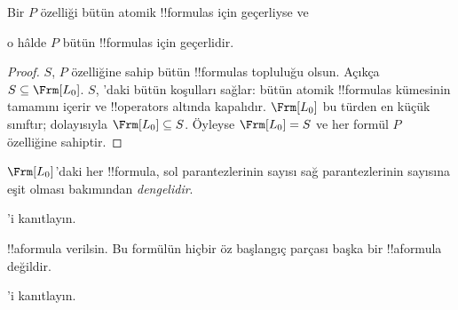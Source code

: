 \documentclass[../../../include/open-logic-section]{subfiles}
\begin{document}


\begin{thm}
  Bir $P$ özelliği bütün atomik !!{formula}s için geçerliyse ve
  \begin{enumerate}
  \end{enumerate}
  o hâlde $P$ bütün !!{formula}s için geçerlidir.
\end{thm}

\begin{proof}
  $S$, $P$ özelliğine sahip bütün !!{formula}s topluluğu olsun. Açıkça
  $S \subseteq \Frm[L_0]$. $S$, 'daki bütün
  koşulları sağlar: bütün atomik !!{formula}s kümesinin tamamını içerir ve
  !!{operator}s
  altında kapalıdır. $\Frm[L_0]$ bu türden en küçük sınıftır; dolayısıyla
  $\Frm[L_0] \subseteq S$. Öyleyse $\Frm[L_0] = S$ ve her formül $P$
  özelliğine sahiptir.
\end{proof}

\begin{prop}
   $\Frm[L_0]$'daki her !!{formula}, sol parantezlerinin sayısı sağ
   parantezlerinin sayısına eşit olması bakımından \emph{dengelidir}.
\end{prop}

\begin{prob}
'i kanıtlayın.
\end{prob}

\begin{prop} 
!!a{formula} verilsin. Bu formülün hiçbir öz başlangıç parçası başka bir
!!a{formula} değildir.
\end{prop}

\begin{prob}
  'i kanıtlayın.
\end{prob}
\end{document}
